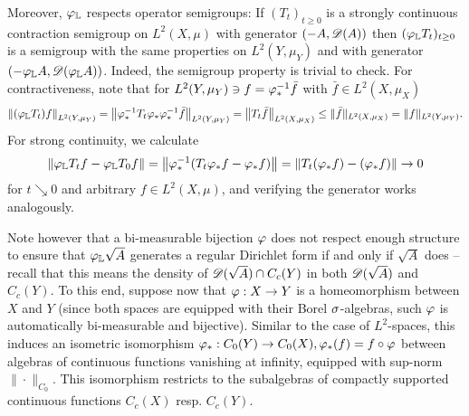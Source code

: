 Moreover, $\varphi_{\mathbb{L}}$ respects operator semigroups: If $(T_t)_{t\geq0}$ is a strongly continuous contraction semigroup on $L^2(X,\mu)$ with generator $(-A,\mathscr{D}(A))$ then $(\varphi_{\mathbb{L}} T_t)_{t\geq0}$ is a semigroup with the same properties on $L^2(Y,\mu_Y)$ and with generator $(-\varphi_{\mathbb{L}} A,\mathscr{D}(\varphi_{\mathbb{L}} A))$. Indeed, the semigroup property is trivial to check. For contractiveness, note that for $L^2(Y,\mu_Y)\ni f=\varphi_*^{-1}\bar f$ with 
$\bar f\in L^2(X,\mu_X)$
\[
  \left\|(\varphi_{\mathbb{L}}T_t)f\right\|_{L^2(Y,\mu_Y)}
  =\left\|\varphi_*^{-1}T_t\varphi_*\varphi_*^{-1}\bar f\right\|_{L^2(Y,\mu_Y)}
  =\left\|T_t\bar f\right\|_{L^2(X,\mu_X)}
  \leq\|\bar f\|_{L^2(X,\mu_X)}=\|f\|_{L^2(Y,\mu_Y)}.
\]
For strong continuity, we calculate
\[
  \left\|\varphi_{\mathbb{L}} T_t f-\varphi_{\mathbb{L}} T_0 f\right\|
  =\left\|\varphi_*^{-1}(T_t\varphi_*f-\varphi_*f)\right\|
  =\left\|T_t(\varphi_*f)-(\varphi_*f)\right\| \to 0
\]
for $t\searrow 0$ and arbitrary $f\in L^2(X,\mu)$, and verifying the generator works analogously. 

Note however that a bi-measurable bijection $\varphi$ does not respect enough structure to ensure that 
$\varphi_{\mathbb{L}} \sqrt{A}$ generates a regular Dirichlet form if and only if $\sqrt{A}$ does -- recall that this means the density of $\mathscr{D}(\sqrt{A})\cap C_c(Y)$ in both $\mathscr{D}(\sqrt{A})$ and $C_c(Y)$. To this end, suppose now that $\varphi:X\to Y$ is a homeomorphism between $X$ and $Y$ (since both spaces are equipped with their Borel $\sigma$-algebras, such $\varphi$ is automatically bi-measurable and bijective). Similar to the case of $L^2$-spaces, this induces an isometric isomorphism $\varphi_*:C_0(Y)\to C_0(X), \varphi_*(f)=f\circ\varphi$ between algebras of continuous functions vanishing at infinity, equipped with sup-norm $\|\cdot\|_{C_0}$. This isomorphism restricts to the subalgebras of compactly supported continuous functions $C_c(X)$ resp. $C_c(Y)$. 

